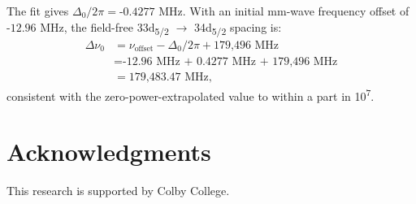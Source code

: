 \documentclass[landscape]{sciposter}
\begin{document}
\begin{multicols}{4}
The fit gives $\Delta_0/2\pi = \textrm{-0.4277 MHz}$. With an initial mm-wave frequency offset of $\textrm{-12.96 MHz}$, the field-free 33d\textsubscript{5/2} $\rightarrow$ 34d\textsubscript{5/2} spacing is:
\begin{align*}
\Delta \nu_0 &= \nu_{\textrm{offset}} - \Delta_0/2\pi + \textrm{179,496 MHz}\\
&= \textrm{-12.96 MHz + 0.4277 MHz + 179,496 MHz} \\ 
&= \textrm{179,483.47 MHz},
\end{align*}
consistent with the zero-power-extrapolated value to within a part in 10\textsuperscript{7}.

\section*{\large Acknowledgments}
This research is supported by Colby College.

\end{multicols}
\end{document}

